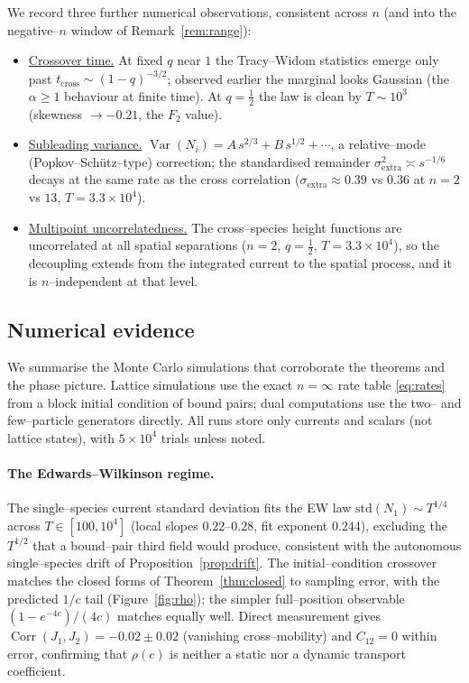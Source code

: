 \documentclass[11pt]{article}
\theoremstyle{plain}
\theoremstyle{definition}
\theoremstyle{remark}
\DeclareMathOperator{\Var}{Var}\DeclareMathOperator{\Cov}{Cov}
\DeclareMathOperator{\Corr}{Corr}\DeclareMathOperator{\cum}{cum}
\begin{document}
We record three further numerical observations, consistent across $n$ (and into the
negative--$n$ window of Remark~\ref{rem:range}):
\begin{itemize}
\item \underline{Crossover time.} At fixed $q$ near $1$ the Tracy--Widom statistics emerge only
past $t_{\mathrm{cross}}\sim(1-q)^{-3/2}$; observed earlier the marginal looks Gaussian
(the $\alpha\ge1$ behaviour at finite time). At $q=\tfrac12$ the law is clean by
$T\sim10^3$ (skewness $\to-0.21$, the $F_2$ value).
\item \underline{Subleading variance.} $\Var(N_i)=A\,s^{2/3}+B\,s^{1/2}+\cdots$, a
relative--mode (Popkov--Sch\"utz--type) correction; the standardised remainder
$\sigma_{\mathrm{extra}}^2\asymp s^{-1/6}$ decays at the same rate as the cross
correlation ($\sigma_{\mathrm{extra}}\approx0.39$ vs $0.36$ at $n=2$ vs $13$,
$T=3.3\times10^4$).
\item \underline{Multipoint uncorrelatedness.} The cross--species height functions are
uncorrelated at all spatial separations ($n=2$, $q=\tfrac12$, $T=3.3\times10^4$), so
the decoupling extends from the integrated current to the spatial process, and it is
$n$--independent at that level.
\end{itemize}

\subsection{Numerical evidence}\label{sec:numerics}

We summarise the Monte Carlo simulations that corroborate the theorems and the
phase picture. Lattice simulations use the exact $n=\infty$ rate table \eqref{eq:rates}
from a block initial condition of bound pairs; dual computations use the two-- and
few--particle generators directly. All runs store only currents and scalars (not lattice
states), with $5\times10^4$ trials unless noted.

\paragraph{The Edwards--Wilkinson regime.}
The single--species current standard deviation fits the EW law $\mathrm{std}(N_1)\sim
T^{1/4}$ across $T\in[100,10^4]$ (local slopes $0.22$--$0.28$, fit exponent $0.244$),
excluding the $T^{1/2}$ that a bound--pair third field would produce, consistent with
the autonomous single--species drift of Proposition~\ref{prop:drift}. The initial--condition crossover matches the closed forms of
Theorem~\ref{thm:closed} to sampling error, with the predicted $1/c$ tail
(Figure~\ref{fig:rho}); the simpler full--position observable $(1-e^{-4c})/(4c)$ matches
equally well. Direct measurement gives $\Corr(J_1,J_2)=-0.02\pm0.02$ (vanishing
cross--mobility) and $C_{12}=0$ within error, confirming that $\rho(c)$ is neither a
static nor a dynamic transport coefficient.
\end{document}
